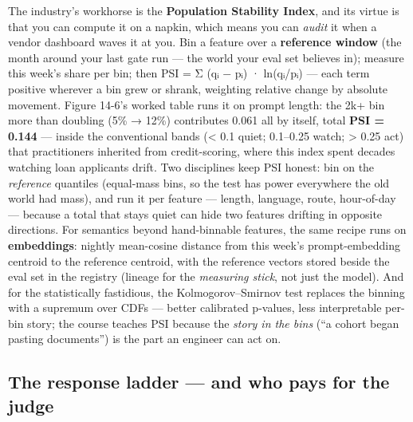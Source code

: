 The industry’s workhorse is the \textbf{Population Stability Index}, and its virtue is that you can compute it on a napkin, which means you can \textit{audit} it when a vendor dashboard waves it at you. Bin a feature over a \textbf{reference window} (the month around your last gate run — the world your eval set believes in); measure this week’s share per bin; then PSI = Σ (qᵢ − pᵢ) · ln(qᵢ/pᵢ) — each term positive wherever a bin grew or shrank, weighting relative change by absolute movement. Figure 14-6’s worked table runs it on prompt length: the 2k+ bin more than doubling (5\% → 12\%) contributes 0.061 all by itself, total \textbf{PSI = 0.144} — inside the conventional bands (< 0.1 quiet; 0.1–0.25 watch; > 0.25 act) that practitioners inherited from credit-scoring, where this index spent decades watching loan applicants drift. Two disciplines keep PSI honest: bin on the \textit{reference} quantiles (equal-mass bins, so the test has power everywhere the old world had mass), and run it per feature — length, language, route, hour-of-day — because a total that stays quiet can hide two features drifting in opposite directions. For semantics beyond hand-binnable features, the same recipe runs on \textbf{embeddings}: nightly mean-cosine distance from this week’s prompt-embedding centroid to the reference centroid, with the reference vectors stored beside the eval set in the registry (lineage for the \textit{measuring stick}, not just the model). And for the statistically fastidious, the Kolmogorov–Smirnov test replaces the binning with a supremum over CDFs — better calibrated p-values, less interpretable per-bin story; the course teaches PSI because the \textit{story in the bins} (“a cohort began pasting documents”) is the part an engineer can act on.

\subsection*{The response ladder — and who pays for the judge}

